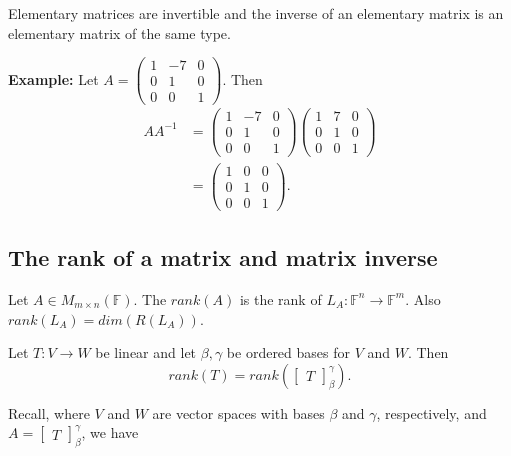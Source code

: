 \documentclass[12pt]{article}
\newenvironment{theorem}[2][Theorem]{\begin{trivlist}
\item[\hskip \labelsep {\bfseries #1}\hskip \labelsep {\bfseries #2.}]}{\end{trivlist}}
\newenvironment{definition}[2][Definition]{\begin{trivlist}
\item[\hskip \labelsep {\bfseries #1}\hskip \labelsep {\bfseries #2}]}{\end{trivlist}}
\begin{document}
\begin{theorem}{3.2}
Elementary matrices are invertible and the inverse of an elementary matrix is an elementary matrix of the same type.
\end{theorem}

\noindent\textbf{Example:}\text{ }
Let $A = \begin{pmatrix}
1 & -7 & 0 \\ 0 & 1 & 0 \\ 0 & 0 & 1
\end{pmatrix}$. Then \begin{align*}
    AA^{-1} &= \begin{pmatrix}
1 & -7 & 0 \\ 0 & 1 & 0 \\ 0 & 0 & 1
\end{pmatrix}\begin{pmatrix}
1 & 7 & 0 \\ 0 & 1 & 0 \\ 0 & 0 & 1
\end{pmatrix} \\
&= \begin{pmatrix}
1 & 0 & 0 \\ 0 & 1 & 0 \\ 0 & 0 & 1
\end{pmatrix}.
\end{align*}

\subsection{The rank of a matrix and matrix inverse}

\begin{definition}{3}
Let $A \in M_{m \times n}(\mathbb{F})$. The $rank(A)$ is the rank of $L_A : \mathbb{F}^n \to \mathbb{F}^m$. Also $rank(L_A) = dim(R(L_A))$.
\end{definition}

\begin{theorem}{3.3}
Let $T : V \to W$ be linear and let $\beta, \gamma$ be ordered bases for $V$ and $W$. Then $$rank(T) = rank\left(\begin{bmatrix} T \end{bmatrix}_{\beta}^\gamma\right).$$
\end{theorem}

Recall, where $V$ and $W$ are vector spaces with bases $\beta$ and $\gamma$, respectively, and $A = \begin{bmatrix}
T
\end{bmatrix}_\beta^\gamma$, we have \begin{center}
\end{center}
\end{document}
